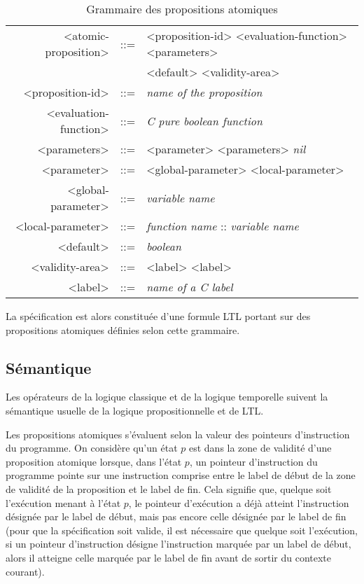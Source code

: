 \begin{table}[h]
\centering
\caption{Grammaire des propositions atomiques}
\label{tab:spe_gram}
\begin{tabular}[]{@{}rcl@{}}
\hline
<atomic-proposition>  & ::= & <proposition-id> <evaluation-function> <parameters>\\
                      &     &  <default> <validity-area>\\
<proposition-id>      & ::= & \emph{name of the proposition}\\
<evaluation-function> & ::= & \emph{C pure boolean function}\\
<parameters>          & ::= & <parameter> <parameters> \textbar{} \emph{nil}\\
<parameter>           & ::= & <global-parameter> \textbar{} <local-parameter>\\
<global-parameter>    & ::= & \emph{variable name}\\
<local-parameter>     & ::= & \emph{function name} :: \emph{variable name}\\
<default>             & ::= & \emph{boolean}\\
<validity-area>       & ::= & <label> <label>\\
<label>               & ::= & \emph{name of a C label}\\
\hline
\end{tabular}
\end{table}

La spécification est alors constituée d'une formule LTL portant sur des
propositions atomiques définies selon cette grammaire.

\subsection{Sémantique}

Les opérateurs de la logique classique et de la logique temporelle
suivent la sémantique usuelle de la logique propositionnelle et de LTL.

Les propositions atomiques s'évaluent selon la valeur des pointeurs
d'instruction du programme. On considère qu'un état \(p\) est dans la zone de
validité d'une proposition atomique lorsque, dans l'état \(p\), un pointeur
d'instruction du programme pointe sur une instruction comprise entre le label de
début de la zone de validité de la proposition et le label de fin. Cela signifie
que, quelque soit l'exécution menant à l'état \(p\), le pointeur d'exécution a
déjà atteint l'instruction désignée par le label de début, mais pas encore celle
désignée par le label de fin (pour que la spécification soit valide, il est
nécessaire que quelque soit l'exécution, si un pointeur d'instruction désigne
l'instruction marquée par un label de début, alors il atteigne celle marquée par
le label de fin avant de sortir du contexte courant).


